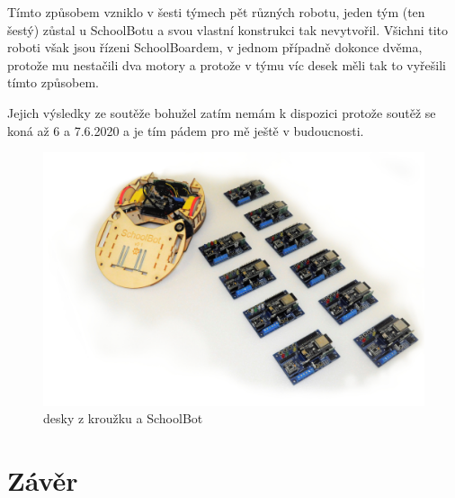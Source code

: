 \documentclass{template/socthesis}
\begin{document}
Tímto způsobem vzniklo v šesti týmech pět různých robotu, jeden tým (ten šestý) zůstal u SchoolBotu a svou vlastní konstrukci tak nevytvořil. Všichni tito roboti však jsou řízeni SchoolBoardem, v jednom případně dokonce dvěma, protože mu nestačili dva motory a protože v týmu víc desek měli tak to vyřešili tímto způsobem.

Jejich výsledky ze soutěže bohužel zatím nemám k dispozici protože soutěž se koná až 6 a 7.6.2020 a je tím pádem pro mě ještě v budoucnosti.

\begin{figure}[h]
	\centering
	\includegraphics[width=1.1\textwidth]{img/sada2.JPG}
	\caption{desky z kroužku a SchoolBot}
\end{figure}


\newpage


\chapter*{Závěr} %



\appendix
{}
	
\end{document}

